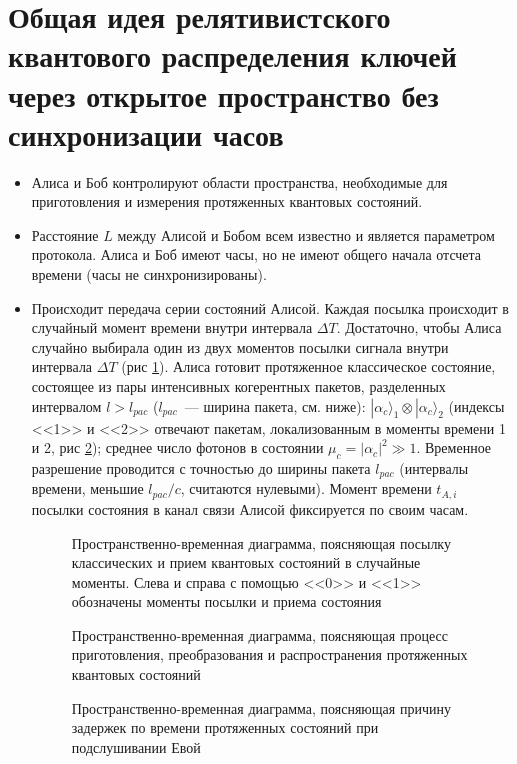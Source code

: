 \section[Общая схема протокола]{Общая идея релятивистского квантового распределения ключей через открытое пространство без синхронизации часов}
\begin{itemize}
  \item Алиса и Боб контролируют области пространства, необходимые для приготовления и измерения протяженных квантовых состояний.
  \item Расстояние $L$ между Алисой и Бобом всем известно и является параметром протокола. Алиса и Боб имеют часы, но не имеют общего начала отсчета времени (часы не синхронизированы).
  \item Происходит передача серии состояний Алисой. Каждая посылка происходит в случайный момент времени внутри интервала $\Delta T$. 
  Достаточно, чтобы Алиса случайно выбирала один из двух моментов посылки сигнала внутри интервала $\Delta T$ (рис \ref{fig:timeline}). 
  Алиса готовит протяженное классическое состояние, состоящее из пары интенсивных когерентных пакетов, разделенных интервалом $l > l_{pac}$ ($l_{pac}$~--- ширина пакета, см. ниже): 
  $|\alpha_c\rangle_1 \otimes|\alpha_c\rangle_2$ (индексы <<1>> и <<2>> отвечают пакетам, локализованным в моменты времени 1 и 2, рис \ref{fig:process}); среднее число фотонов в состоянии $\mu_c = |\alpha_c|^2 \gg 1$. 
  Временное разрешение проводится с точностью до ширины пакета $l_{pac}$ (интервалы времени, меньшие $l_{pac} / c$, считаются нулевыми). 
  Момент времени $t_{A,i}$ посылки состояния в канал связи Алисой фиксируется по своим часам.
  
  \begin{figure}[h]
  \caption{Пространственно-временная диаграмма, поясняющая посылку классических и прием квантовых состояний в случайные моменты. Слева и справа с помощью <<0>> и <<1>> обозначены моменты посылки и приема состояния}
  \label{fig:timeline}
  \end{figure}
  \begin{figure}[h]
  \caption{Пространственно-временная диаграмма, поясняющая процесс приготовления, преобразования и распространения протяженных квантовых состояний}
  \label{fig:process}
  \end{figure}
  \begin{figure}[h]
  \caption{Пространственно-временная диаграмма, поясняющая причину задержек по времени протяженных состояний при подслушивании Евой}
  \label{fig:detected}
  \end{figure}
  

\end{itemize}
